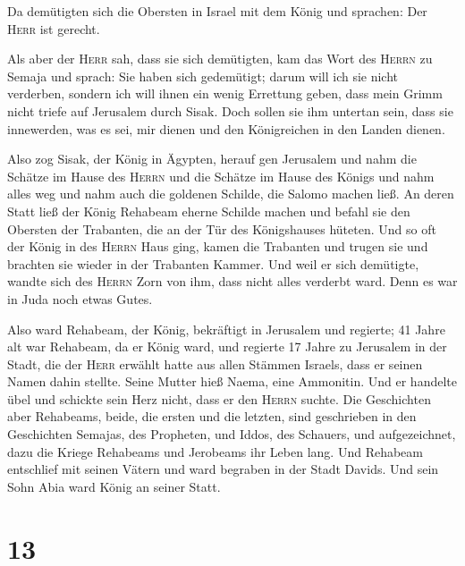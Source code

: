  Da demütigten sich die Obersten in Israel mit dem König
und sprachen: Der \textsc{Herr} ist gerecht.

 Als aber der \textsc{Herr} sah, dass sie sich demütigten,
kam das Wort des \textsc{Herrn} zu Semaja und sprach: Sie haben sich
gedemütigt; darum will ich sie nicht verderben, sondern ich will ihnen
ein wenig Errettung geben, dass mein Grimm nicht triefe auf Jerusalem
durch Sisak.  Doch sollen sie ihm untertan sein, dass sie
innewerden, was es sei, mir dienen und den Königreichen in den Landen
dienen.

 Also zog Sisak, der König in Ägypten, herauf gen
Jerusalem und nahm die Schätze im Hause des \textsc{Herrn} und die
Schätze im Hause des Königs und nahm alles weg und nahm auch die
goldenen Schilde, die Salomo machen ließ.  An deren Statt
ließ der König Rehabeam eherne Schilde machen und befahl sie den
Obersten der Trabanten, die an der Tür des Königshauses hüteten.
 Und so oft der König in des \textsc{Herrn} Haus ging,
kamen die Trabanten und trugen sie und brachten sie wieder in der
Trabanten Kammer.  Und weil er sich demütigte, wandte
sich des \textsc{Herrn} Zorn von ihm, dass nicht alles verderbt ward.
Denn es war in Juda noch etwas Gutes.

 Also ward Rehabeam, der König, bekräftigt in Jerusalem
und regierte; 41 Jahre alt war Rehabeam, da er König ward, und regierte
17 Jahre zu Jerusalem in der Stadt, die der \textsc{Herr} erwählt hatte
aus allen Stämmen Israels, dass er seinen Namen dahin stellte. Seine
Mutter hieß Naema, eine Ammonitin.  Und er handelte übel
und schickte sein Herz nicht, dass er den \textsc{Herrn} suchte.
 Die Geschichten aber Rehabeams, beide, die ersten und
die letzten, sind geschrieben in den Geschichten Semajas, des Propheten,
und Iddos, des Schauers, und aufgezeichnet, dazu die Kriege Rehabeams
und Jerobeams ihr Leben lang.  Und Rehabeam entschlief
mit seinen Vätern und ward begraben in der Stadt Davids. Und sein Sohn
Abia ward König an seiner Statt.

\hypertarget{section-12}{%
\section{13}\label{section-12}}

